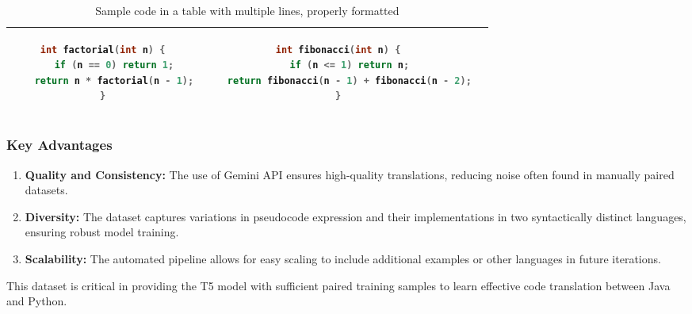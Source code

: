 \documentclass{dhbenelux}
\begin{document}
\begin{table}[h!]
\begin{tabular}{|c|c|c|}
\begin{minipage}[t]{0.3\textwidth}
\begin{lstlisting}[language=C, basicstyle=\ttfamily, breaklines=true]
int factorial(int n) {
    if (n == 0) return 1;
    return n * factorial(n - 1);
}
\end{lstlisting}
\end{minipage}
&
\begin{minipage}[t]{0.3\textwidth}
\begin{lstlisting}[language=C, basicstyle=\ttfamily, breaklines=true]
int fibonacci(int n) {
    if (n <= 1) return n;
    return fibonacci(n - 1) + fibonacci(n - 2);
}
\end{lstlisting}
\end{minipage}
\\
\hline
\end{tabular}
\caption{Sample code in a table with multiple lines, properly formatted}
\end{table}

\subsubsection{Key Advantages}

\begin{enumerate}
  \item \textbf{Quality and Consistency:} The use of Gemini API ensures high-quality translations, reducing noise often found in manually paired datasets.
  \item \textbf{Diversity:} The dataset captures variations in pseudocode expression and their implementations in two syntactically distinct languages, ensuring robust model training.
  \item \textbf{Scalability:} The automated pipeline allows for easy scaling to include additional examples or other languages in future iterations.
\end{enumerate}

This dataset is critical in providing the T5 model with sufficient paired training samples to learn effective code translation between Java and Python.
\end{document}
